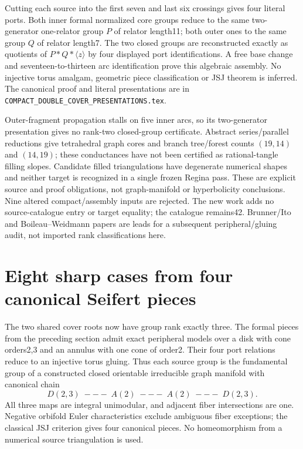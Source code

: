 \documentclass[11pt]{article}
\begin{document}
Cutting each source into the first seven and last six crossings gives
four literal ports. Both inner formal normalized core groups reduce
to the same two-generator one-relator group $P$ of relator length11;
both outer ones to the same group $Q$ of relator length7. The two closed
groups are reconstructed exactly as quotients of
$P*Q*\langle z\rangle$ by four displayed port identifications. A free
base change and seventeen-to-thirteen arc identification prove this
algebraic assembly. No injective torus amalgam, geometric piece
classification or JSJ theorem is inferred. The canonical proof and
literal presentations are in
\texttt{COMPACT\_DOUBLE\_COVER\_PRESENTATIONS.tex}.

Outer-fragment propagation stalls on five inner arcs, so its two-generator
presentation gives no rank-two closed-group certificate. Abstract
series/parallel reductions give tetrahedral graph cores and branch
tree/forest counts $(19,14)$ and $(14,19)$; these conductances have not
been certified as rational-tangle filling slopes. Candidate filled
triangulations have degenerate numerical shapes and neither target is
recognized in a single frozen Regina pass. These are explicit source
and proof obligations, not graph-manifold or hyperbolicity conclusions.
Nine altered compact/assembly inputs are rejected. The new work adds
no source-catalogue entry or target equality; the catalogue remains42.
Brunner/Ito and Boileau--Weidmann papers are leads for a subsequent
peripheral/gluing audit, not imported rank classifications here.

\section{Eight sharp cases from four canonical Seifert pieces}

The two shared cover roots now have group rank exactly three.
The formal pieces from the preceding section admit exact peripheral
models over a disk with cone orders2,3 and an annulus with one cone
of order2. Their four port relations reduce to an injective torus
gluing. Thus each source group is the fundamental group of a constructed
closed orientable irreducible graph manifold with canonical chain
\[
 D(2,3)\;---\;A(2)\;---\;A(2)\;---\;D(2,3).
\]
All three maps are integral unimodular, and adjacent fiber intersections
are one. Negative orbifold Euler characteristics exclude ambiguous
fiber exceptions; the classical JSJ criterion gives four canonical pieces.
No homeomorphism from a numerical source triangulation is used.
\end{document}
